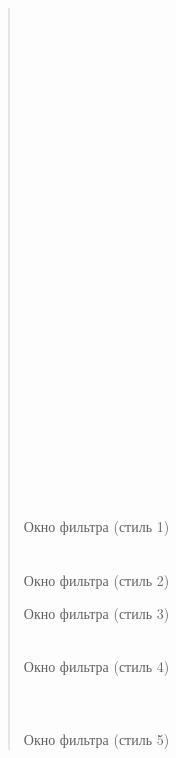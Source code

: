 \documentclass[letterpaper,10pt,russian]{sphinxmanual}
\begin{document}
\begin{quote}
\sphinxAtStartPar
\\
\\
\\
\\
\\
\\
\\
\\
\\
\\
\\
\\
\\
\\
\\
\\
\\
\\
\\
\\
\\
\\
\\
\\
\\
\\
Окно фильтра (стиль 1)

\noindent{}

\sphinxAtStartPar
\\
Окно фильтра (стиль 2)

\noindent{}

\sphinxAtStartPar
Окно фильтра (стиль 3)

\noindent{}

\sphinxAtStartPar
\\
Окно фильтра (стиль 4)

\noindent{}

\sphinxAtStartPar
\\
\\
Окно фильтра (стиль 5)

\noindent{}


\end{quote}
\end{document}
